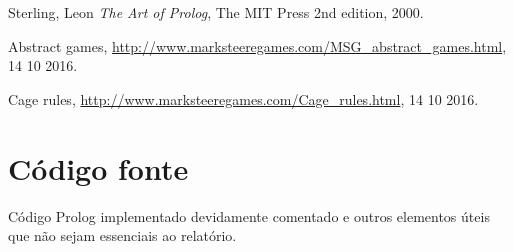 \documentclass[a4paper]{article}
\begin{document}
\begin{thebibliography}{9}
  Sterling, Leon
  \emph{The Art of Prolog},
  The MIT Press
  2nd edition,
  2000.
  
  Abstract games,
  \url{http://www.marksteeregames.com/MSG_abstract_games.html}, 14 10 2016.
  
  Cage rules,
  \url{http://www.marksteeregames.com/Cage_rules.html}, 14 10 2016.
\end{thebibliography}

\newpage
\appendix
\section{Código fonte}
Código Prolog implementado devidamente comentado e outros elementos úteis que não sejam essenciais ao relatório.
\end{document}
